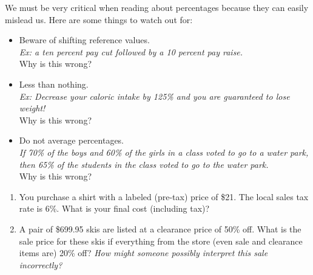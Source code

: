 \documentclass[12pt]{article}
\begin{document}
\pagebreak
We must be very critical when reading about percentages because they can easily mislead us. Here are some things to watch out for:
\begin{itemize}
\item Beware of shifting reference values.\\
\emph{Ex: a ten percent pay cut followed by a 10 percent pay raise.}\\
Why is this wrong?
\vspace{0.5in}

\item Less than nothing.\\
\emph{Ex: Decrease your caloric intake by 125\% and you are guaranteed to lose weight!}\\
Why is this wrong?
\vspace{0.5in}

\item Do not average percentages.\\
\emph{If 70\% of the boys and 60\% of the girls in a class voted to go to a water park, then 65\% of the students in the class voted to go to the water park.}\\
Why is this wrong?
\vspace{0.5in}
\end{itemize}

\begin{enumerate}
\item You purchase a shirt with a labeled (pre-tax) price of \$21. The local sales tax rate is 6\%. What is your final cost (including tax)?
\vspace{2in}
\item A pair of \$699.95 skis are listed at a clearance price of 50\% off.  What is the sale price for these skis if everything from the store (even sale and clearance items are) 20\% off? 
\emph{How might someone possibly interpret this sale incorrectly?}
\vspace{2in}
\end{enumerate}
\end{document}
